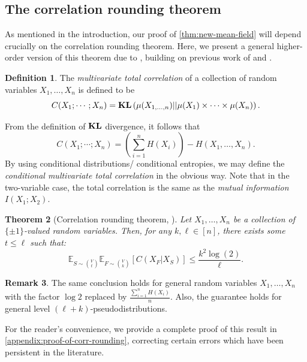 \documentclass[11pt, oneside, english]{article}
\newcommand{\bE}{\mathbb{E}}
\newcommand{\E}{\bE}      %
\newcommand{\KL}{\mathop{\bf KL\/}}
\newtheorem{theorem}{Theorem}[section]
\theoremstyle{definition}
\newtheorem{definition}[theorem]{Definition}
\newtheorem{remark}[theorem]{Remark}
\theoremstyle{plain}
\begin{document}
\subsection{The correlation rounding theorem}
As mentioned in the introduction, our proof of \cref{thm:new-mean-field} will depend crucially on the correlation rounding theorem. Here, we present a general higher-order version of this theorem due to \cite{manurangsi2017birthday}, building on previous work of \cite{raghavendra-tan} and \cite{yoshida-zhou}. %

\begin{definition}
The \emph{multivariate total correlation} of a collection of random variables $X_1,\dots,X_n$ is defined to be
\[ C(X_1; \cdots; X_n) = \KL\left(\mu(X_{1,\ldots,n}) || \mu(X_1) \times \cdots \times \mu(X_n)\right).\]
\end{definition}
From the definition of $\KL$ divergence, it follows that 
\[ C(X_1; \cdots; X_n) = \left(\sum_{i=1}^{n}H(X_i)\right) - H(X_1,\ldots,X_n).\]
By using conditional distributions/ conditional entropies, we may define the \emph{conditional multivariate total correlation} in the obvious way. Note that in the two-variable case, the total correlation is the same as the \emph{mutual information} $I(X_1;X_2)$.
\begin{theorem}[Correlation rounding theorem, \cite{manurangsi2017birthday}]
\label{thm:correlation-rounding}
Let $X_1,\dots,X_n$ be a collection of $\{\pm 1\}$-valued random variables. Then, for any $k,\ell \in [n]$, there exists some $t\leq \ell$ such that:  
\[ \E_{S \sim \binom{V}{t}} \E_{F \sim {V \choose k}}[C(X_F | X_S)] \le \frac{k^2 \log(2)}{\ell}.\]
\end{theorem}
\begin{remark}
The same conclusion holds for general random variables $X_1,\dots,X_n$ with the factor $\log{2}$ replaced by $\frac{\sum_{i=1}^{n}H(X_i)}{n}$. Also, the guarantee holds for general level $(\ell + k)$-pseudodistributions.
\end{remark}
For the reader's convenience, we provide a complete proof of this result in \cref{appendix:proof-of-corr-rounding}, correcting certain errors which have been persistent in the literature.
\end{document}
